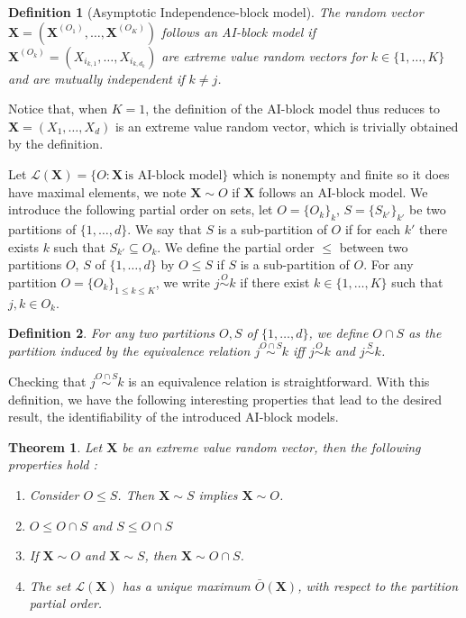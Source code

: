 \documentclass[11pt]{article}
\newtheorem{definition}{Definition}
\newtheorem{theorem}{Theorem}
\begin{document}
	\begin{definition}[Asymptotic Independence-block model]
		 The random vector $\textbf{X} = (\textbf{X}^{(O_1)}, \dots, \textbf{X}^{(O_K)})$ follows an AI-block model if $\textbf{X}^{(O_k)} = (X_{i_{k,1}}, \dots, X_{i_{k,d_k}})$ are extreme value random vectors for $k \in \{1,\dots,K\}$ and are mutually independent if $k \neq j$.
	\end{definition}
	
	Notice that, when $K=1$, the definition of the AI-block model thus reduces to $\textbf{X} = (X_1,\dots,X_d)$ is an extreme value random vector, which is trivially obtained by the definition. 
	
	Let $\mathcal{L}(\textbf{X}) = \{O : \textbf{X} \, \textrm{is AI-block model}\}$ which is nonempty and finite so it does have maximal elements, we note $\textbf{X} \sim O$ if $\textbf{X}$ follows an AI-block model. We introduce the following partial order on sets, let $O = \{O_k\}_k$, $S = \{S_{k'}\}_{k'}$ be two partitions of $\{1,\dots,d\}$. We say that $S$ is a sub-partition of $O$ if for each $k'$ there exists $k$ such that $S_{k'} \subseteq O_k$. We define the partial order $\leq$ between two partitions $O$, $S$ of $\{1,\dots,d\}$ by $O \leq S$ if $S$ is a sub-partition of $O$. For any partition $O = \{O_k\}_{1 \leq k \leq K}$, we write $j \overset{O}{\sim} k$ if there exist $k \in \{1,\dots,K\}$ such that $j,k \in O_k$.
	
	\begin{definition}
		For any two partitions $O, S$ of $\{1,\dots,d\}$, we define $O \cap S$ as the partition induced by the equivalence relation $j \overset{O \cap S}{\sim} k$ iff $j \overset{O}{\sim} k$ and $j \overset{S}{\sim} k$.
	\end{definition}
	Checking that $j \overset{O \cap S}{\sim} k$ is an equivalence relation is straightforward. With this definition, we have the following interesting properties that lead to the desired result, the identifiability of the introduced AI-block models.
	\begin{theorem}
		\label{thm:unicity}
		Let $\textbf{X}$ be an extreme value random vector, then the following properties hold :
		\begin{enumerate}
			\item Consider $O \leq S$. Then $\textbf{X} \sim S$ implies $\textbf{X} \sim O$.
			\item $O \leq O\cap S$ and $S \leq O \cap S$
			\item If $\textbf{X} \sim O$ and $\textbf{X} \sim S$, then  $\textbf{X} \sim O \cap S$.
			\item The set $\mathcal{L}(\textbf{X})$ has a unique maximum $\bar{O}(\textbf{X})$, with respect to the partition partial order.
		\end{enumerate}
	\end{theorem}
	
\end{document}
